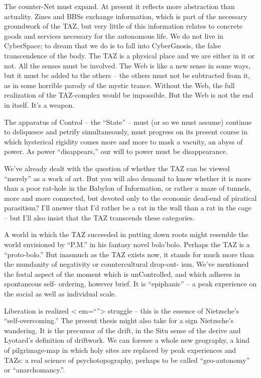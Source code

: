 \documentclass[a4paper,english,10pt,twoside]{article}
\begin{document}
\medskip
The counter-Net must expand. At present it reflects more abstraction than actuality. Zines and BBSs exchange information, which is part of the necessary groundwork of the TAZ, but very little of this information relates to concrete goods and services necessary for the autonomous life. We do not live in CyberSpace; to dream that we do is to fall into CyberGnosis, the false transcendence of the body. The TAZ is a physical place and we are either in it or not. All the senses must be involved. The Web is like a new sense in some ways, but it must be added to the others --  the others must not be subtracted from it, as in some horrible parody of the mystic trance. Without the Web, the full realization of the TAZ-complex would be impossible. But the Web is not the end in itself. It's a weapon.

\medskip
The apparatus of Control -- the \enquote{State} -- must (or so we must assume) continue to deliquesce and petrify simultaneously, must progress on its present course in which hysterical rigidity comes more and more to mask a vacuity, an abyss of power. As power \enquote{disappears,} our will to power must be disappearance. 

\medskip
We've already dealt with the question of whether the TAZ can be viewed \enquote{merely} as a work of art. But you will also demand to know whether it is more than a poor rat-hole in the Babylon of Information, or rather a maze of tunnels, more and more connected, but devoted only to the economic dead-end of piratical parasitism? I'll answer that I'd rather be a rat in the wall than a rat in the cage -- but I'll also insist that the TAZ transcends these categories.

\medskip
A world in which the TAZ succeeded in putting down roots might resemble the world envisioned by \enquote{P.M.} in his fantasy novel bolo'bolo. Perhaps the TAZ is a \enquote{proto-bolo.} But inasmuch as the TAZ exists now, it stands for much more than the mundanity of negativity or countercultural drop-out- ism. We've mentioned the festal aspect of the moment which is unControlled, and which adheres in spontaneous self- ordering, however brief. It is \enquote{epiphanic} -- a peak experience on the social as well as individual scale.

\medskip
Liberation is realized < em=\enquote{}> struggle -- this is the essence of Nietzsche's \enquote{self-overcoming.} The present thesis might also take for a sign Nietzsche's wandering. It is the precursor of the drift, in the Situ sense of the derive and Lyotard's definition of driftwork. We can foresee a whole new geography, a kind of pilgrimage-map in which holy sites are replaced by peak experiences and TAZs: a real science of psychotopography, perhaps to be called \enquote{geo-autonomy} or \enquote{anarchomancy.}.
\end{document}
